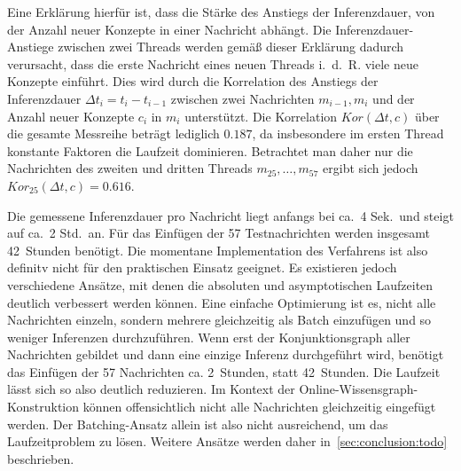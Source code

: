 Eine Erklärung hierfür ist, dass die Stärke des Anstiegs der Inferenzdauer, von der Anzahl neuer Konzepte in einer Nachricht abhängt.
Die Inferenzdauer-Anstiege zwischen zwei Threads werden gemäß dieser Erklärung dadurch verursacht, dass die erste Nachricht eines neuen Threads i.~d.~R. viele neue Konzepte einführt.
Dies wird durch die Korrelation des Anstiegs der Inferenzdauer $\Delta t_i = t_i - t_{i - 1}$ zwischen zwei Nachrichten $m_{i - 1}, m_i$ und der Anzahl neuer Konzepte $c_i$ in $m_i$ unterstützt.
Die Korrelation $Kor(\Delta t, c)$ über die gesamte Messreihe beträgt lediglich $0.187$, da insbesondere im ersten Thread konstante Faktoren die Laufzeit dominieren.
Betrachtet man daher nur die Nachrichten des zweiten und dritten Threads $m_{25}, \dots, m_{57}$ ergibt sich jedoch $Kor_{25}(\Delta t, c) = 0.616$.

Die gemessene Inferenzdauer pro Nachricht liegt anfangs bei ca.\ 4 Sek.\ und steigt auf ca.\ 2 Std.\ an.
Für das Einfügen der 57 Testnachrichten werden insgesamt 42~Stunden benötigt.
Die momentane Implementation des Verfahrens ist also definitv nicht für den praktischen Einsatz geeignet.
Es existieren jedoch verschiedene Ansätze, mit denen die absoluten und asymptotischen Laufzeiten deutlich verbessert werden können.
Eine einfache Optimierung ist es, nicht alle Nachrichten einzeln, sondern mehrere gleichzeitig als Batch einzufügen und so weniger Inferenzen durchzuführen.
Wenn erst der Konjunktionsgraph aller Nachrichten gebildet und dann eine einzige Inferenz durchgeführt wird, benötigt das Einfügen der 57 Nachrichten ca. 2~Stunden, statt 42~Stunden.
Die Laufzeit lässt sich so also deutlich reduzieren.
Im Kontext der Online-Wissensgraph-Konstruktion können offensichtlich nicht alle Nachrichten gleichzeitig eingefügt werden.
Der Batching-Ansatz allein ist also nicht ausreichend, um das Laufzeitproblem zu lösen.
Weitere Ansätze werden daher in~\ref{sec:conclusion:todo} beschrieben.
